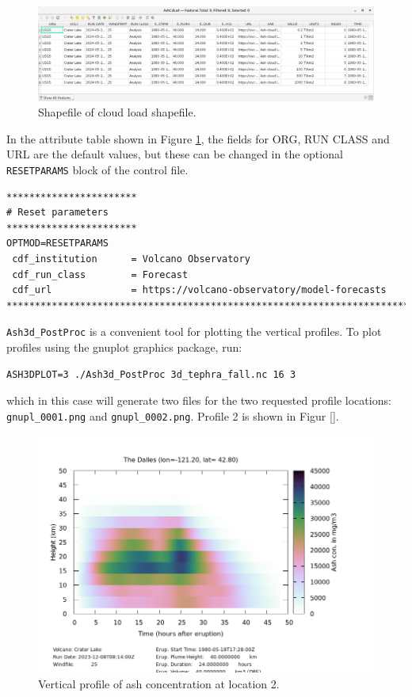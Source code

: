 \begin{figure}[htbp]
\includegraphics[angle=0,scale=0.27]{Figures/Ash3dOutput_ShpAtrCloudLoad_QGIS.png}
\parbox{15cm}{\caption{\label{FigAsh3dAsh3dPP_shapeAtr}
Shapefile of cloud load shapefile.}}
\end{figure}

In the attribute table shown in Figure \ref{FigAsh3dAsh3dPP_shapeAtr}, the fields for
ORG, RUN CLASS and URL are the default values, but these can be changed in the
optional \texttt{RESETPARAMS} block of the control file.

\small
\begin{verbatim}
***********************
# Reset parameters
***********************
OPTMOD=RESETPARAMS
 cdf_institution      = Volcano Observatory
 cdf_run_class        = Forecast
 cdf_url              = https://volcano-observatory/model-forecasts
*******************************************************************************
\end{verbatim}
\normalsize

\texttt{Ash3d\_PostProc} is a convenient tool for plotting the vertical profiles.
To plot profiles using the gnuplot graphics package, run:
\small
\begin{verbatim}
ASH3DPLOT=3 ./Ash3d_PostProc 3d_tephra_fall.nc 16 3
\end{verbatim}
\normalsize
which in this case will generate two files for the two requested profile locations:
\texttt{gnupl\_0001.png} and \texttt{gnupl\_0002.png}. Profile 2 is shown in Figur
\ref{}.

\begin{figure}[htbp]
\includegraphics[angle=0,scale=0.5]{Figures/gnupl_0002.png}
\parbox{15cm}{\caption{\label{FigAsh3dAsh3dPP_vertprof}
Vertical profile of ash concentration at location 2.}}
\end{figure}

